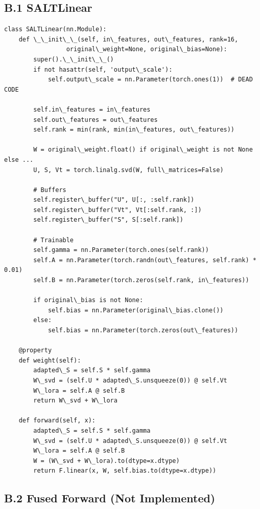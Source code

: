 \subsection{B.1 SALTLinear}

\begin{lstlisting}
class SALTLinear(nn.Module):
    def \_\_init\_\_(self, in\_features, out\_features, rank=16,
                 original\_weight=None, original\_bias=None):
        super().\_\_init\_\_()
        if not hasattr(self, 'output\_scale'):
            self.output\_scale = nn.Parameter(torch.ones(1))  # DEAD CODE
        
        self.in\_features = in\_features
        self.out\_features = out\_features
        self.rank = min(rank, min(in\_features, out\_features))

        W = original\_weight.float() if original\_weight is not None else ...
        U, S, Vt = torch.linalg.svd(W, full\_matrices=False)
        
        # Buffers
        self.register\_buffer("U", U[:, :self.rank])
        self.register\_buffer("Vt", Vt[:self.rank, :])
        self.register\_buffer("S", S[:self.rank])
        
        # Trainable
        self.gamma = nn.Parameter(torch.ones(self.rank))
        self.A = nn.Parameter(torch.randn(out\_features, self.rank) * 0.01)
        self.B = nn.Parameter(torch.zeros(self.rank, in\_features))
        
        if original\_bias is not None:
            self.bias = nn.Parameter(original\_bias.clone())
        else:
            self.bias = nn.Parameter(torch.zeros(out\_features))
    
    @property
    def weight(self):
        adapted\_S = self.S * self.gamma
        W\_svd = (self.U * adapted\_S.unsqueeze(0)) @ self.Vt
        W\_lora = self.A @ self.B
        return W\_svd + W\_lora
    
    def forward(self, x):
        adapted\_S = self.S * self.gamma
        W\_svd = (self.U * adapted\_S.unsqueeze(0)) @ self.Vt
        W\_lora = self.A @ self.B
        W = (W\_svd + W\_lora).to(dtype=x.dtype)
        return F.linear(x, W, self.bias.to(dtype=x.dtype))
\end{lstlisting}

\subsection{B.2 Fused Forward (Not Implemented)}


